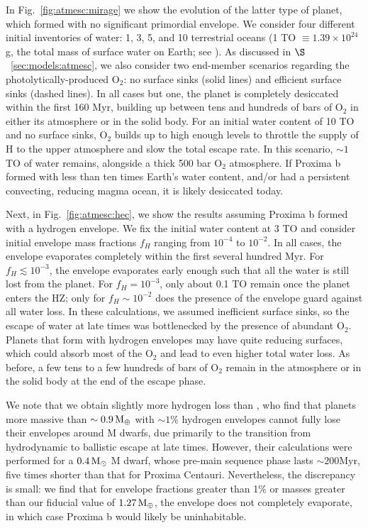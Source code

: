 \documentclass[preprint,12pt]{aastex}
\def\mearth{{\rm\,M_\oplus}}
\def\msun{{\rm\,M_\odot}}
\begin{document}
In Fig.~\ref{fig:atmesc:mirage} we show the evolution of the latter
type of planet, which formed with no significant primordial
envelope. We consider four different initial inventories of water: 1,
3, 5, and 10 terrestrial oceans (1 TO $\equiv 1.39\times 10^{24}$ g,
the total mass of surface water on Earth; see \cite{Kasting88}). As
discussed in $\S$~\ref{sec:models:atmesc}, we also consider two end-member
scenarios regarding the photolytically-produced O$_2$: no surface
sinks (solid lines) and efficient surface sinks (dashed lines). In all
cases but one, the planet is completely desiccated within the first
160 Myr, building up between tens and hundreds of bars of O$_2$ in
either its atmosphere or in the solid body. For an initial water
content of 10 TO and no surface sinks, O$_2$ builds up to high enough
levels to throttle the supply of H to the upper atmosphere and slow
the total escape rate. In this scenario, $\sim 1$ TO of water remains,
alongside a thick 500 bar O$_2$ atmosphere. If Proxima b formed with
less than ten times Earth's water content, and/or had a persistent
convecting, reducing magma ocean, it is likely desiccated today.

Next, in Fig.~\ref{fig:atmesc:hec}, we show the results assuming
Proxima b formed with a hydrogen envelope. We fix the initial water
content at 3 TO and consider initial envelope mass fractions $f_H$
ranging from $10^{-4}$ to $10^{-2}$. In all cases, the envelope
evaporates completely within the first several hundred Myr. For $f_H
\lesssim 10^{-3}$, the envelope evaporates early enough such that all
the water is still lost from the planet. For $f_H = 10^{-3}$, only
about 0.1 TO remain once the planet enters the HZ; only for $f_H \sim
10^{-2}$ does the presence of the envelope guard against all water
loss. In these calculations, we assumed inefficient surface sinks, so
the escape of water at late times was bottlenecked by the presence of
abundant O$_2$. Planets that form with hydrogen envelopes may have
quite reducing surfaces, which could absorb most of the O$_2$ and lead
to even higher total water loss. As before, a few tens to a few
hundreds of bars of O$_2$ remain in the atmosphere or in the solid
body at the end of the escape phase.

We note that we obtain slightly more hydrogen loss than
\cite{OwenMohanty16}, who find that planets more massive than $\sim
0.9 \mearth$ with $\sim 1\%$ hydrogen envelopes cannot fully lose
their envelopes around M dwarfs, due primarily to the transition from
hydrodynamic to ballistic escape at late times. However, their
calculations were performed for a $0.4 \msun$ M dwarf, whose pre-main
sequence phase lasts $\sim 200 \mathrm{Myr}$, five times shorter than
that for Proxima Centauri. Nevertheless, the discrepancy is small: we
find that for envelope fractions greater than 1\% or masses greater
than our fiducial value of $1.27 \mearth$, the envelope does not
completely evaporate, in which case Proxima b would likely be
uninhabitable.
\end{document}
